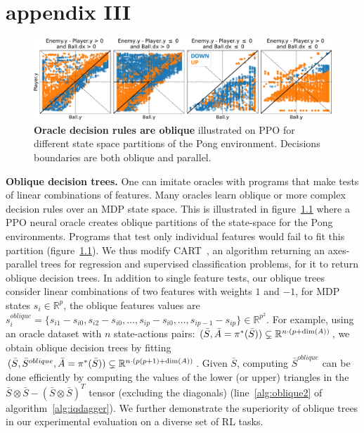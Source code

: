 \chapter{appendix III}
\label{chap-app-imit}
\begin{figure}[b]
    \centering
    \includegraphics[width=1.\textwidth]{images/images_part3/pong_state_space.pdf}
    \caption{\textbf{Oracle decision rules are oblique} illustrated on PPO for different state space partitions of the Pong environment. Decisions boundaries are both oblique and parallel.}
    \label{fig:pong_states}
\end{figure}

\textbf{Oblique decision trees.} One can imitate oracles with programs that make tests of linear combinations of features. Many oracles learn oblique or more complex decision rules over an MDP state space. This is illustrated in figure~\ref{fig:pong_states} where a PPO neural oracle creates oblique partitions of the state-space for the Pong environments. Programs that test only individual features would fail to fit this partition (\cf figure~\ref{fig:pong_states}). 
We thus modify CART~\citep{breiman}, an algorithm returning an axes-parallel trees for regression and supervised classification problems, for it to return oblique decision trees. 
In addition to single feature tests, our oblique trees consider linear combinations of two features with weights $1$ and $-1$, \eg\@ for MDP states $s_i \in \mathbb{R}^{p}$, the oblique features values are $s^{oblique}_i = \{s_{i1} - s_{i0}, s_{i2} - s_{i0}, ..., s_{ip} - s_{i0}, ...,s_{ip-1} - s_{ip}\} \in \mathbb{R}^{p^2}$. For example, using an oracle dataset with $n$ state-actions pairs: $(\bar{S}, \Bar{A} = \pi^{*}(\bar{S})) \subsetneq \mathbb{R}^{n\cdot(p+\dim(A))}$, we obtain oblique decision trees by fitting $(\bar{S},\bar{S}^{oblique} , \Bar{A} = \pi^{*}(\bar{S})) \subsetneq \mathbb{R}^{n\cdot(p(p+1)+\dim(A))}$. 
Given $\bar{S}$, computing $\bar{S}^{oblique}$ can be done efficiently by computing the values of the lower (or upper) triangles in the $\bar{S} \otimes \bar{S} - (\bar{S} \otimes \bar{S})^T$ tensor (excluding the diagonals) (\cf line~\ref{alg:oblique2} of algorithm~\ref{alg:iqdagger}). We further demonstrate the superiority of oblique trees in our experimental evaluation on a diverse set of RL tasks.


